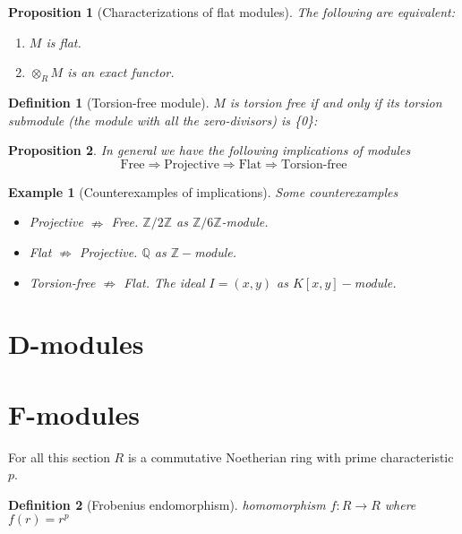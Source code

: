 \documentclass[leqno]{article}
\newtheorem{proposition}{Proposition}
\newtheorem{definition}{Definition}
\newtheorem{example}{Example}
\begin{document}
\begin{proposition}[Characterizations of flat modules] The following are equivalent:
\begin{enumerate}[topsep=-6pt, itemsep=0pt]
  \item $M$ is flat.
  \item $\otimes _RM$ is an exact functor.
\end{enumerate}
\end{proposition}

\begin{definition}[Torsion-free module] $M$ is torsion free if and only if its torsion submodule (the module with all the zero-divisors) is \{0\}:

\end{definition}

\begin{proposition}
In general we have the following implications of modules
\[
\text{Free} \Rightarrow \text{Projective} \Rightarrow \text{Flat} \Rightarrow \text{Torsion-free}
\] 
\end{proposition}

\begin{example}[Counterexamples of implications] Some counterexamples
\begin{itemize}[topsep=-6pt, itemsep=0pt]
  \item Projective $\nRightarrow$ Free. $\mathbb{Z} / 2\mathbb{Z}$ as  $\mathbb{Z} / 6\mathbb{Z}$-module.
  \item Flat $\nRightarrow$ Projective. $\mathbb{Q}$ as $\mathbb{Z}-$module.
  \item Torsion-free $\nRightarrow$ Flat. The ideal $I=(x,y)$ as $K[x, y]-$module.
\end{itemize}
\end{example}




\section{D-modules}

\section{F-modules}
For all this section $R$ is a commutative Noetherian ring with prime characteristic $p$.
\begin{definition}[Frobenius endomorphism] homomorphism $f:R\to R $ where $f(r)=r^p$

\end{definition}
\end{document}
